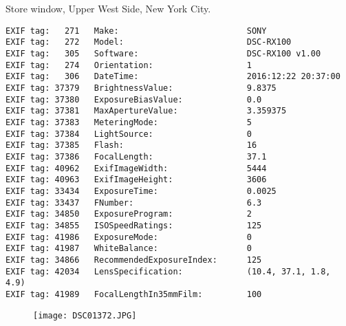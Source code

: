 \section{\protect{}}
\noindent Store window, Upper West Side, New York City.
\noindent
\begin{lstlisting}
EXIF tag:   271   Make:                          SONY
EXIF tag:   272   Model:                         DSC-RX100
EXIF tag:   305   Software:                      DSC-RX100 v1.00
EXIF tag:   274   Orientation:                   1
EXIF tag:   306   DateTime:                      2016:12:22 20:37:00
EXIF tag: 37379   BrightnessValue:               9.8375
EXIF tag: 37380   ExposureBiasValue:             0.0
EXIF tag: 37381   MaxApertureValue:              3.359375
EXIF tag: 37383   MeteringMode:                  5
EXIF tag: 37384   LightSource:                   0
EXIF tag: 37385   Flash:                         16
EXIF tag: 37386   FocalLength:                   37.1
EXIF tag: 40962   ExifImageWidth:                5444
EXIF tag: 40963   ExifImageHeight:               3606
EXIF tag: 33434   ExposureTime:                  0.0025
EXIF tag: 33437   FNumber:                       6.3
EXIF tag: 34850   ExposureProgram:               2
EXIF tag: 34855   ISOSpeedRatings:               125
EXIF tag: 41986   ExposureMode:                  0
EXIF tag: 41987   WhiteBalance:                  0
EXIF tag: 34866   RecommendedExposureIndex:      125
EXIF tag: 42034   LensSpecification:             (10.4, 37.1, 1.8, 4.9)
EXIF tag: 41989   FocalLengthIn35mmFilm:         100

\end{lstlisting}
\clearpage
\begin{figure}
\raggedleft
\texttt{[image: DSC01372.JPG]}
\end{figure}

